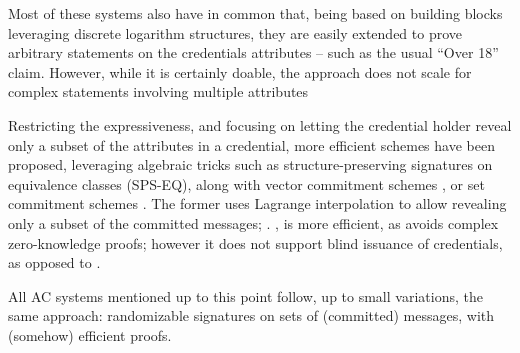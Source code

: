Most of these systems also have in common that, being based on building blocks
leveraging discrete logarithm structures, they are easily extended to prove
arbitrary statements on the credentials attributes -- such as the usual ``Over
18'' claim. However, while it is certainly doable, the approach does not scale
for complex statements involving multiple attributes 

Restricting the expressiveness, and focusing on letting the credential holder
reveal only a subset of the attributes in a credential, more efficient schemes
have been proposed, leveraging algebraic tricks such as structure-preserving
signatures on equivalence classes (SPS-EQ), along with vector commitment schemes
\cite{cdhk15}, or set commitment schemes \cite{fhs19}. The former uses Lagrange
interpolation to allow revealing only a subset of the committed messages;
. \cite{fhs19}, is more
efficient, as avoids complex zero-knowledge proofs; however it does not support
blind issuance of credentials, as opposed to \cite{cdhk15} .


All AC systems mentioned up to this point follow, up to small variations, the
same approach: randomizable signatures on sets of (committed) messages, with
(somehow) efficient proofs. 


